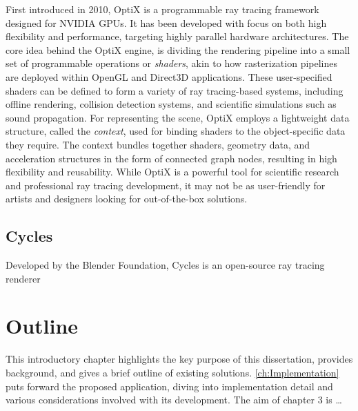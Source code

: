 First introduced in 2010, OptiX \supercite{Parker2010} is a programmable ray tracing framework designed for NVIDIA GPUs.
It has been developed with focus on both high flexibility and performance, targeting highly parallel hardware architectures.
The core idea behind the OptiX engine, is dividing the rendering pipeline into a small set of programmable operations or \textit{shaders}, akin to how rasterization pipelines are deployed within OpenGL and Direct3D applications.
These user-specified shaders can be defined to form a variety of ray tracing-based systems, including offline rendering, collision detection systems, and scientific simulations such as sound propagation.
For representing the scene, OptiX employs a lightweight data structure, called the \textit{context}, used for binding shaders to the object-specific data they require.
The context bundles together shaders, geometry data, and acceleration structures in the form of connected graph nodes, resulting in high flexibility and reusability.
While OptiX is a powerful tool for scientific research and professional ray tracing development, it may not be as user-friendly for artists and designers looking for out-of-the-box solutions.

\subsection{Cycles}

Developed by the Blender Foundation, Cycles is an open-source ray tracing renderer 

\section{Outline}

This introductory chapter highlights the key purpose of this dissertation, provides background, and gives a brief outline of existing solutions. 
\cref{ch:Implementation} puts forward the proposed application, diving into implementation detail and various considerations involved with its development. The aim of chapter 3 is \dots
